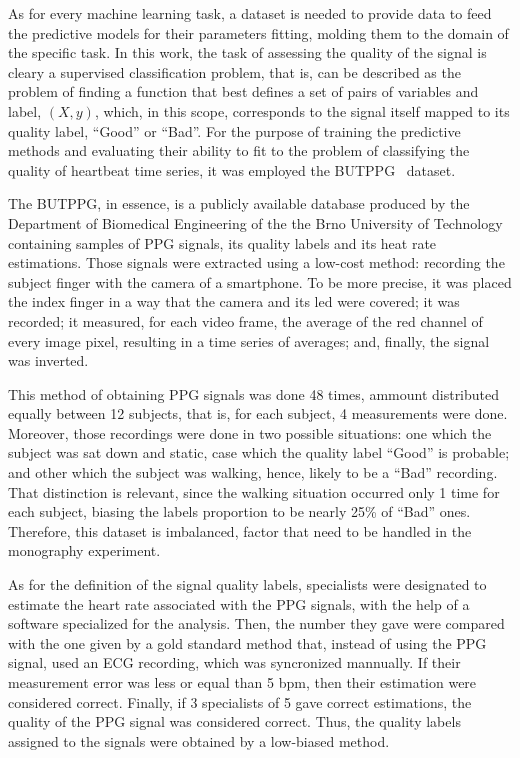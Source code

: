 As for every machine learning task, a dataset is needed to provide data to feed the predictive models for their parameters fitting, molding them to the domain of the specific task. In this work, the task of assessing the quality of the signal is cleary a supervised classification problem, that is, can be described as the problem of finding a function that best defines a set of pairs of variables and label, $(X,y)$, which, in this scope, corresponds to the signal itself mapped to its quality label, ``Good'' or ``Bad''. For the purpose of training the predictive methods and evaluating their ability to fit to the problem of classifying the quality of heartbeat time series, it was employed the \acrshort{BUTPPG}~\cite{butppg} dataset.

The \acrfull{BUTPPG}, in essence, is a publicly available database produced by the Department of Biomedical Engineering of the the Brno University of Technology containing samples of \acrshort{PPG} signals, its quality labels and its heat rate estimations. Those signals were extracted using a low-cost method: recording the subject finger with the camera of a smartphone. To be more precise, it was placed the index finger in a way that the camera and its led were covered; it was recorded; it measured, for each video frame, the average of the red channel of every image pixel, resulting in a time series of averages; and, finally, the signal was inverted.  

This method of obtaining \acrshort{PPG} signals was done 48 times, ammount distributed equally between 12 subjects, that is, for each subject, 4 measurements were done. Moreover, those recordings were done in two possible situations: one which the subject was sat down and static, case which the quality label ``Good'' is probable; and other which the subject was walking, hence, likely to be a ``Bad'' recording. That distinction is relevant, since the walking situation occurred only 1 time for each subject, biasing the labels proportion to be nearly 25\% of ``Bad'' ones. Therefore, this dataset is imbalanced, factor that need to be handled in the monography experiment.

As for the definition of the signal quality labels, specialists were designated to estimate the heart rate associated with the \acrshort{PPG} signals, with the help of a software specialized for the analysis. Then, the number they gave were compared with the one given by a gold standard method that, instead of using the \acrshort{PPG} signal, used an ECG recording, which was syncronized mannually. If their measurement error was less or equal than 5 bpm, then their estimation were considered correct. Finally, if 3 specialists of 5 gave correct estimations, the quality of the \acrshort{PPG} signal was considered correct. Thus, the quality labels assigned to the signals were obtained by a low-biased method. 

